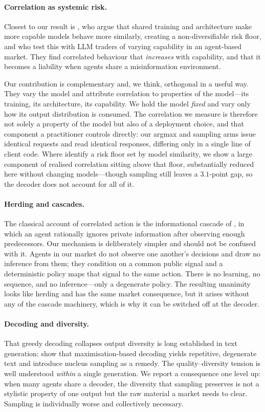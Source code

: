 \documentclass[11pt]{article}
\begin{document}
\paragraph{Correlation as systemic risk.} Closest to our result is
\citet{ross2026}, who argue that shared training and architecture make more
capable models behave more similarly, creating a non-diversifiable risk floor,
and who test this with LLM traders of varying capability in an agent-based
market. They find correlated behaviour that \emph{increases} with capability,
and that it becomes a liability when agents share a misinformation
environment.

Our contribution is complementary and, we think, orthogonal in a useful way.
They vary the model and attribute correlation to properties of the model---its
training, its architecture, its capability. We hold the model \emph{fixed} and
vary only how its output distribution is consumed. The correlation we measure
is therefore not solely a property of the model but also of a deployment
choice, and that component a practitioner controls directly: our argmax and sampling arms
issue identical requests and read identical responses, differing only in a
single line of client code. Where \citet{ross2026} identify a risk floor set by
model similarity, we show a large component of realised correlation sitting
above that floor, substantially reduced here without changing models---though
sampling still leaves a $3.1$-point gap, so the decoder does not account for
all of it.

\paragraph{Herding and cascades.} The classical account of correlated action is
the informational cascade of \citet{bikhchandani1992}, in which an agent
rationally ignores private information after observing enough predecessors.
Our mechanism is deliberately simpler and should not be confused with it.
Agents in our market do not observe one another's decisions and draw no
inference from them; they condition on a common public signal and a
deterministic policy maps that signal to the same action. There is no learning,
no sequence, and no inference---only a degenerate policy. The resulting
unanimity looks like herding and has the same market consequence, but it
arises without any of the cascade machinery, which is why it can be switched
off at the decoder.

\paragraph{Decoding and diversity.} That greedy decoding collapses output
diversity is long established in text generation: \citet{holtzman2020} show
that maximisation-based decoding yields repetitive, degenerate text and
introduce nucleus sampling as a remedy. The quality--diversity tension is
well understood \emph{within} a single generation. We report a consequence one
level up: when many agents share a decoder, the diversity that sampling
preserves is not a stylistic property of one output but the raw material a
market needs to clear. Sampling is individually worse and collectively
necessary.
\end{document}
